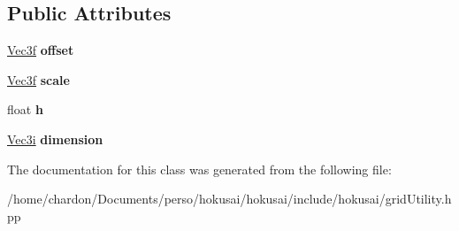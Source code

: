 \subsection*{Public Attributes}
\begin{DoxyCompactItemize}
\item 
\hypertarget{classhokusai_1_1GridUtility_ab708f764a63360f125857ca2d3a004a8}{\hyperlink{classhokusai_1_1Vec3}{Vec3f} {\bfseries offset}}\label{classhokusai_1_1GridUtility_ab708f764a63360f125857ca2d3a004a8}

\item 
\hypertarget{classhokusai_1_1GridUtility_aa3705785ccd46d02ca079269e12ef0e9}{\hyperlink{classhokusai_1_1Vec3}{Vec3f} {\bfseries scale}}\label{classhokusai_1_1GridUtility_aa3705785ccd46d02ca079269e12ef0e9}

\item 
\hypertarget{classhokusai_1_1GridUtility_a1749c31acfb0463dead42ffa9b4d8bda}{float {\bfseries h}}\label{classhokusai_1_1GridUtility_a1749c31acfb0463dead42ffa9b4d8bda}

\item 
\hypertarget{classhokusai_1_1GridUtility_af7e87159020383698df21030cb1a981c}{\hyperlink{classhokusai_1_1Vec3}{Vec3i} {\bfseries dimension}}\label{classhokusai_1_1GridUtility_af7e87159020383698df21030cb1a981c}

\end{DoxyCompactItemize}


The documentation for this class was generated from the following file\+:\begin{DoxyCompactItemize}
\item 
/home/chardon/\+Documents/perso/hokusai/hokusai/include/hokusai/grid\+Utility.\+hpp\end{DoxyCompactItemize}
